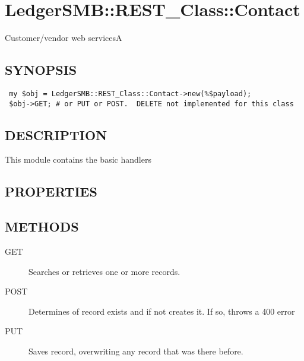 \begin{description}
\begin{description}
\begin{description}
\begin{description}
\begin{description}
\begin{description}
\begin{description}
\end{description}
\section{LedgerSMB::REST\_Class::Contact\label{LedgerSMB::REST_Class::Contact}}


Customer/vendor web servicesA

\subsection*{SYNOPSIS\label{LedgerSMB::REST_Class::Contact_SYNOPSIS}}
\begin{verbatim}
 my $obj = LedgerSMB::REST_Class::Contact->new(%$payload);
 $obj->GET; # or PUT or POST.  DELETE not implemented for this class
\end{verbatim}
\subsection*{DESCRIPTION\label{LedgerSMB::REST_Class::Contact_DESCRIPTION}}


This module contains the basic  handlers

\subsection*{PROPERTIES\label{LedgerSMB::REST_Class::Contact_PROPERTIES}}
\subsection*{METHODS\label{LedgerSMB::REST_Class::Contact_METHODS}}
\begin{description}

\item[{GET}] \mbox{}

Searches or retrieves one or more records.


\item[{POST}] \mbox{}

Determines of record exists and if not creates it.  If so, throws a 400 error


\item[{PUT}] \mbox{}

Saves record, overwriting any record that was there before.



\end{description}
\end{description}
\end{description}
\end{description}
\end{description}
\end{description}
\end{description}
